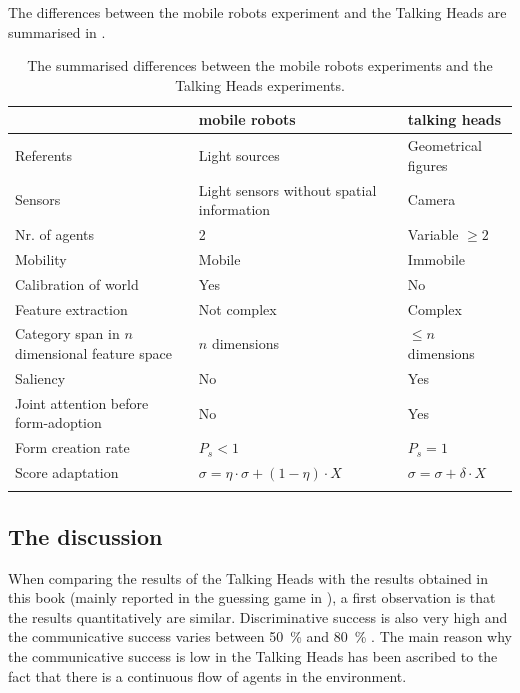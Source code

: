 The differences between the mobile robots experiment and the Talking Heads are summarised in .

\begin{table}
\centering
\begin{tabular}{>{\raggedright}p{4cm}>{\raggedright}p{4cm}l}
\lsptoprule
 & {\sc mobile robots} & {\sc talking heads}\\\midrule
 Referents & Light sources & Geometrical figures\\\hline
 Sensors & Light sensors without spatial information & Camera\\\hline
 Nr. of agents & 2 & Variable $\geq 2$\\\hline
 Mobility & Mobile & Immobile\\\hline
 Calibration of world & Yes & No\\\hline
 Feature extraction & Not complex & Complex\\\hline
 Category span in $n$ dimensional feature space & $n$ dimensions & $\leq n$ dimensions\\\hline
 Saliency & No & Yes\\\hline
 Joint attention before form-adoption & No & Yes\\\hline
 Form creation rate & $P_s<1$ & $P_s=1$\\\hline
 Score adaptation & $\sigma = \eta \cdot \sigma + (1-\eta) \cdot X$ & $\sigma = \sigma + \delta \cdot X$\\%
\lspbottomrule
\end{tabular}
\caption{The summarised differences between the mobile robots experiments and the Talking Heads experiments.}
\label{t:disc:differences}
\end{table}


\subsection{The discussion}

When comparing the results of the Talking Heads \citep{steels:2000,kaplan:2000} with the results obtained in this book (mainly reported in the guessing game in ), a first observation is that the results quantitatively are similar. Discriminative success is also very high \citep{steels:2000} and the communicative success varies between 50~\% and 80~\% \citep{kaplan:2000}. The main reason why the communicative success is low in the Talking Heads has been ascribed to the fact that there is a continuous flow of agents in the environment.

